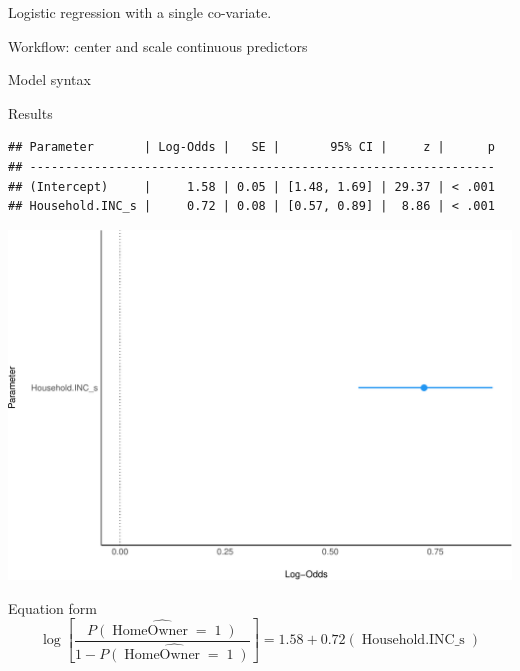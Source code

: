 \documentclass[
  ignorenonframetext,
]{beamer}
\begin{document}
\begin{frame}[fragile]{Logistic regression with a single co-variate.}
\protect\hypertarget{logistic-regression-with-a-single-co-variate.}{}
\begin{block}{Workflow: center and scale continuous predictors}
\protect\hypertarget{workflow-center-and-scale-continuous-predictors}{}
\end{block}

\begin{block}{Model syntax}
\protect\hypertarget{model-syntax}{}
\end{block}

\begin{block}{Results}
\protect\hypertarget{results}{}
\begin{verbatim}
## Parameter       | Log-Odds |   SE |       95% CI |     z |      p
## -----------------------------------------------------------------
## (Intercept)     |     1.58 | 0.05 | [1.48, 1.69] | 29.37 | < .001
## Household.INC_s |     0.72 | 0.08 | [0.57, 0.89] |  8.86 | < .001
\end{verbatim}

\includegraphics{slides_files/figure-beamer/unnamed-chunk-8-1.pdf}
\end{block}

\begin{block}{Equation form}
\protect\hypertarget{equation-form-1}{}
\[
\log\left[ \frac { \widehat{P( \operatorname{HomeOwner} = \operatorname{1} )} }{ 1 - \widehat{P( \operatorname{HomeOwner} = \operatorname{1} )} } \right] = 1.58 + 0.72(\operatorname{Household.INC\_s})
\]


\end{block}
\end{frame}
\end{document}

